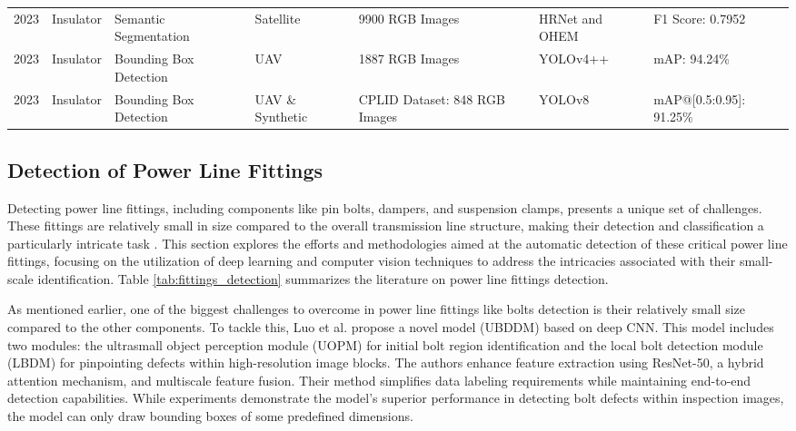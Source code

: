 \begin{table*}[htb]
\begin{tabular}{P{.05} P{.1} P{.15} P{.1} P{.15} P{.1} P{.15}}
2023 \cite{zhou_insulator_2023} & Insulator & Semantic Segmentation & Satellite & 9900 RGB Images & HRNet and OHEM & F1 Score: 0.7952 \\

2023 \cite{shuang_rsin_dataset_2023} & Insulator & Bounding Box Detection & UAV & 1887 RGB Images & YOLOv4++ & mAP: 94.24\% \\

2023 \cite{singh_2023_interpretable} & Insulator & Bounding Box Detection & UAV \& Synthetic & CPLID Dataset: 848 RGB Images & YOLOv8 & mAP@[0.5:0.95]: 91.25\%   \\
\hline
\end{tabular}
\end{table*}

\subsection{Detection of Power Line Fittings }
Detecting power line fittings, including components like pin bolts, dampers, and suspension clamps, presents a unique set of challenges. These fittings are relatively small in size compared to the overall transmission line structure, making their detection and classification a particularly intricate task \cite{luo_ultrasmall_2023}. This section explores the efforts and methodologies aimed at the automatic detection of these critical power line fittings, focusing on the utilization of deep learning and computer vision techniques to address the intricacies associated with their small-scale identification. Table \ref{tab:fittings_detection} summarizes the literature on power line fittings detection.

As mentioned earlier, one of the biggest challenges to overcome in power line fittings like bolts detection is their relatively small size compared to the other components. To tackle this, Luo et al. \cite{luo_ultrasmall_2023} propose a novel model (UBDDM) based on deep CNN. This model includes two modules: the ultrasmall object perception module (UOPM) for initial bolt region identification and the local bolt detection module  (LBDM) for pinpointing defects within high-resolution image blocks. The authors enhance feature extraction using ResNet-50, a hybrid attention mechanism, and multiscale feature fusion. Their method simplifies data labeling requirements while maintaining end-to-end detection capabilities. While experiments demonstrate the model's superior performance in detecting bolt defects within inspection images, the model can only draw bounding boxes of some predefined dimensions.

